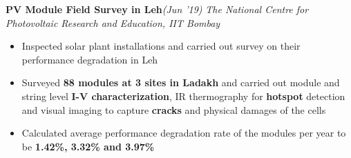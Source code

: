 \documentclass[10 pt]{article}%
\begin{document}
{{{\flushleft \bf {\large{PV Module Field Survey in Leh}}}\hfill {{{\em{(Jun '19)}}}}
\vspace{-0.8em}
{\flushleft \em{The National Centre for Photovoltaic Research and Education, IIT Bombay}}
\vspace{-5pt}
\begin{itemize}[leftmargin=*]
\setlength\itemsep{1pt}
\setlength\parskip{1pt}
\item Inspected solar plant installations and carried out survey on their performance degradation in Leh
\item Surveyed \textbf{88 modules at 3 sites in Ladakh} and carried out module and string level \textbf{I-V characterization}, IR thermography for \textbf{hotspot} detection and visual imaging to capture \textbf{cracks} and physical damages of the cells
\item Calculated average performance degradation rate of the modules per year to be \textbf{1.42\%, 3.32\% and 3.97\%} %
\end{itemize}

}}
\end{document}

